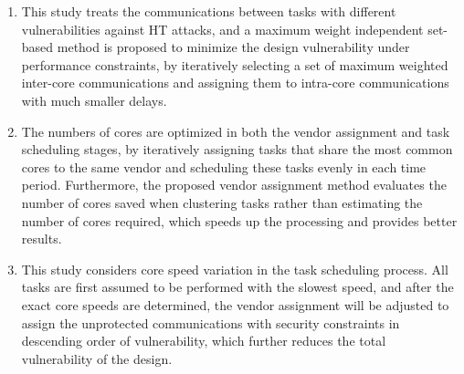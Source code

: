 \documentclass[10pt,journal, compsoc]{IEEEtran}
\begin{document}







\begin{enumerate}

\item This study treats the communications between tasks with different vulnerabilities against HT attacks, and a maximum weight independent set-based method is proposed to minimize the design vulnerability under performance constraints, by iteratively selecting a set of maximum weighted inter-core communications and assigning them to intra-core communications with much smaller delays.

\item The numbers of cores are optimized in both the vendor assignment and task scheduling stages, by iteratively assigning tasks that share the most common cores to the same vendor and scheduling these tasks evenly in each time period. Furthermore, the proposed vendor assignment method evaluates the number of cores saved when clustering tasks rather than estimating the number of cores required, which speeds up the processing and provides better results.

\item This study considers core speed variation in the task scheduling process. All tasks are first assumed to be performed with the slowest speed, and after the exact core speeds are determined, the vendor assignment will be adjusted to assign the unprotected communications with security constraints in descending order of vulnerability, which further reduces the total vulnerability of the design.

\end{enumerate}
\end{document}

